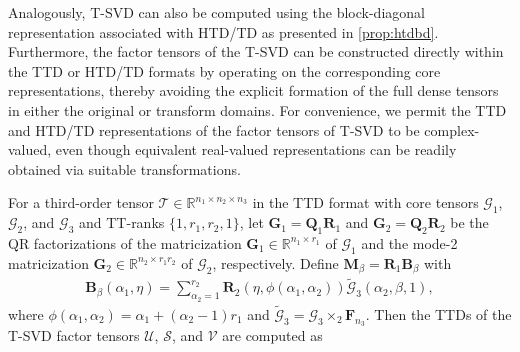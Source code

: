 \documentclass[onefignum,onetabnum]{siamart250211}
\begin{document}
Analogously,  T-SVD can also be computed using the block-diagonal representation associated with HTD/TD as presented in \cref{prop:htdbd}. Furthermore, the factor tensors of the T-SVD can be constructed directly within the TTD or HTD/TD formats by operating on the corresponding core representations, thereby avoiding the explicit formation of the full dense tensors in either the original or transform domains. For convenience, we permit the TTD and HTD/TD representations of the factor tensors of T-SVD to be complex-valued, even though equivalent real-valued representations can be readily obtained via suitable transformations.


\begin{proposition} 
\label{prop:ttd_tsvd}
    For a third-order tensor $\mathscr{T}\in\mathbb{R}^{n_1\times n_2\times n_3}$ in the TTD format with core tensors $\mathscr{G}_1$, $\mathscr{G}_2$, and $\mathscr{G}_3$ and TT-ranks $\{1,r_1,r_2,1\}$, let $\textbf{G}_1=\textbf{Q}_1\textbf{R}_1$ and $\textbf{G}_2=\textbf{Q}_2\textbf{R}_2$ be the QR factorizations of the matricization $\textbf{G}_1\in\mathbb{R}^{n_1\times r_1}$ of $\mathscr{G}_1$ and the mode-2 matricization $\textbf{G}_2\in\mathbb{R}^{n_2\times r_1r_2}$ of $\mathscr{G}_2$, respectively. Define $\textbf{M}_{\beta}=\textbf{R}_1\textbf{B}_{\beta}$ with
\begin{align*}
\textbf{B}_{\beta}(\alpha_1,\eta)
=
\sum_{\alpha_2=1}^{r_2}
\textbf{R}_2(\eta, \phi(\alpha_1, \alpha_2))
\widetilde{\mathscr{G}}_3(\alpha_2,\beta,1),
\end{align*} where $\phi(\alpha_1, \alpha_2) = \alpha_1+(\alpha_2-1)r_1$ and $\widetilde{\mathscr{G}}_3=\mathscr{G}_3\times_2\textbf{F}_{n_3}$.
Then the TTDs of the T-SVD factor tensors $\mathscr{U}$, $\mathscr{S}$, and $\mathscr{V}$ are computed as

\end{proposition}
\end{document}
